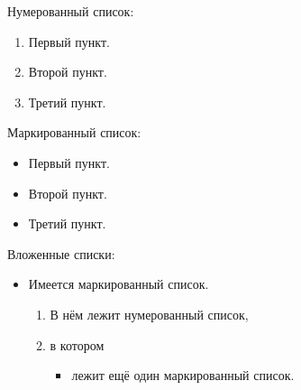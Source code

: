 \noindent Нумерованный список:
\begin{enumerate}
  \item Первый пункт.
  \item Второй пункт.
  \item Третий пункт.
\end{enumerate}

\noindent Маркированный список:
\begin{itemize}
  \item Первый пункт.
  \item Второй пункт.
  \item Третий пункт.
\end{itemize}

\noindent Вложенные списки:
\begin{itemize}
  \item Имеется маркированный список.
  \begin{enumerate}
    \item В нём лежит нумерованный список,
    \item в котором
    \begin{itemize}
      \item лежит ещё один маркированный список.
    \end{itemize}
  \end{enumerate}
\end{itemize}


\clearpage
